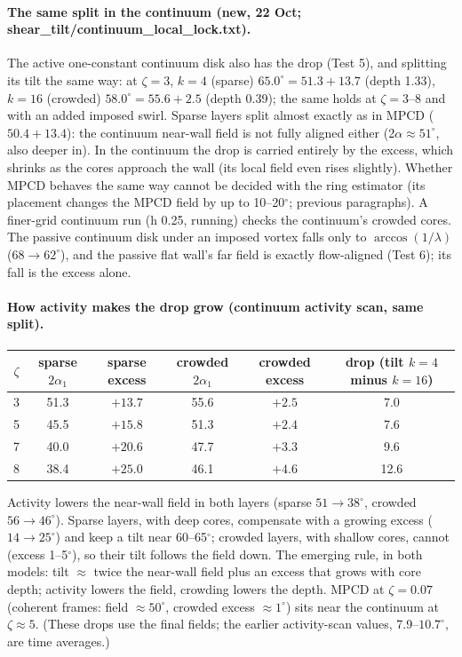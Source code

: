 \documentclass[11pt,a4paper]{article}
\begin{document}
\paragraph{The same split in the continuum (new, 22 Oct; shear\_tilt/continuum\_local\_lock.txt).} The active one-constant continuum disk also has the
drop (Test 5), and splitting its tilt the same way: at $\zeta=3$, $k=4$ (sparse) $65.0^\circ=51.3+13.7$ (depth 1.33), $k=16$ (crowded) $58.0^\circ=55.6+2.5$ (depth
0.39); the same holds at $\zeta=3$--8 and with an added imposed swirl. Sparse layers split almost exactly as in MPCD ($50.4+13.4$): the continuum
near-wall field is not fully aligned either (2$\alpha\approx51^\circ$, also deeper in). In the continuum the drop is carried entirely by the excess, which
shrinks as the cores approach the wall (its local field even rises slightly). Whether MPCD behaves the same way cannot be decided with the ring estimator (its placement changes the MPCD field by up to 10--20$^\circ$; previous
paragraphs). A finer-grid continuum run (h 0.25, running) checks the continuum's crowded cores. The passive continuum disk under an imposed vortex falls only to
$\arccos(1/\lambda)$ ($68\to62^\circ$), and the passive flat wall's far field is exactly flow-aligned (Test 6); its fall is the excess alone.

\paragraph{How activity makes the drop grow (continuum activity scan, same split).}
\begin{center}\small
\begin{tabular}{cccccc}\toprule
$\zeta$ & sparse $2\alpha_1$ & sparse excess & crowded $2\alpha_1$ & crowded excess & drop (tilt $k=4$ minus $k=16$)\\\midrule
3 & 51.3 & $+13.7$ & 55.6 & $+2.5$ & 7.0\\
5 & 45.5 & $+15.8$ & 51.3 & $+2.4$ & 7.6\\
7 & 40.0 & $+20.6$ & 47.7 & $+3.3$ & 9.6\\
8 & 38.4 & $+25.0$ & 46.1 & $+4.6$ & 12.6\\\bottomrule
\end{tabular}\end{center}
Activity lowers the near-wall field in both layers (sparse $51\to38^\circ$, crowded $56\to46^\circ$). Sparse layers, with deep cores, compensate with a growing
excess ($14\to25^\circ$) and keep a tilt near 60--65$^\circ$; crowded layers, with shallow cores, cannot (excess 1--5$^\circ$), so their tilt follows the field down.
The emerging rule, in both models: tilt $\approx$ twice the near-wall field plus an excess that grows with core depth; activity lowers the field,
crowding lowers the depth. MPCD at $\zeta=0.07$ (coherent frames: field $\approx50^\circ$, crowded excess $\approx1^\circ$) sits near the continuum at $\zeta\approx5$.
(These drops use the final fields; the earlier activity-scan values, 7.9--$10.7^\circ$, are time averages.)
\end{document}
